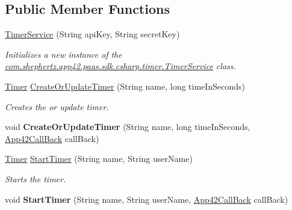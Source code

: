 \subsection*{Public Member Functions}
\begin{DoxyCompactItemize}
\item 
\hyperlink{classcom_1_1shephertz_1_1app42_1_1paas_1_1sdk_1_1csharp_1_1timer_1_1_timer_service_a6005b3ff75001cf47c66de6950a2f92c}{Timer\+Service} (String api\+Key, String secret\+Key)
\begin{DoxyCompactList}\small\item\em Initializes a new instance of the \hyperlink{classcom_1_1shephertz_1_1app42_1_1paas_1_1sdk_1_1csharp_1_1timer_1_1_timer_service}{com.\+shephertz.\+app42.\+paas.\+sdk.\+csharp.\+timer.\+Timer\+Service} class. \end{DoxyCompactList}\item 
\hyperlink{classcom_1_1shephertz_1_1app42_1_1paas_1_1sdk_1_1csharp_1_1timer_1_1_timer}{Timer} \hyperlink{classcom_1_1shephertz_1_1app42_1_1paas_1_1sdk_1_1csharp_1_1timer_1_1_timer_service_a71fb8a17e7787a229fa6765c00180dac}{Create\+Or\+Update\+Timer} (String name, long time\+In\+Seconds)
\begin{DoxyCompactList}\small\item\em Creates the or update timer. \end{DoxyCompactList}\item 
\hypertarget{classcom_1_1shephertz_1_1app42_1_1paas_1_1sdk_1_1csharp_1_1timer_1_1_timer_service_afbe886a79998291a83df6595b1f77c0f}{void {\bfseries Create\+Or\+Update\+Timer} (String name, long time\+In\+Seconds, \hyperlink{interfacecom_1_1shephertz_1_1app42_1_1paas_1_1sdk_1_1csharp_1_1_app42_call_back}{App42\+Call\+Back} call\+Back)}\label{classcom_1_1shephertz_1_1app42_1_1paas_1_1sdk_1_1csharp_1_1timer_1_1_timer_service_afbe886a79998291a83df6595b1f77c0f}

\item 
\hyperlink{classcom_1_1shephertz_1_1app42_1_1paas_1_1sdk_1_1csharp_1_1timer_1_1_timer}{Timer} \hyperlink{classcom_1_1shephertz_1_1app42_1_1paas_1_1sdk_1_1csharp_1_1timer_1_1_timer_service_a05fa6d0abaa722aa02f78d6161136a22}{Start\+Timer} (String name, String user\+Name)
\begin{DoxyCompactList}\small\item\em Starts the timer. \end{DoxyCompactList}\item 
\hypertarget{classcom_1_1shephertz_1_1app42_1_1paas_1_1sdk_1_1csharp_1_1timer_1_1_timer_service_ab12e4304c1a0a7f39481c5ea1c75e5a0}{void {\bfseries Start\+Timer} (String name, String user\+Name, \hyperlink{interfacecom_1_1shephertz_1_1app42_1_1paas_1_1sdk_1_1csharp_1_1_app42_call_back}{App42\+Call\+Back} call\+Back)}\label{classcom_1_1shephertz_1_1app42_1_1paas_1_1sdk_1_1csharp_1_1timer_1_1_timer_service_ab12e4304c1a0a7f39481c5ea1c75e5a0}


\end{DoxyCompactItemize}
